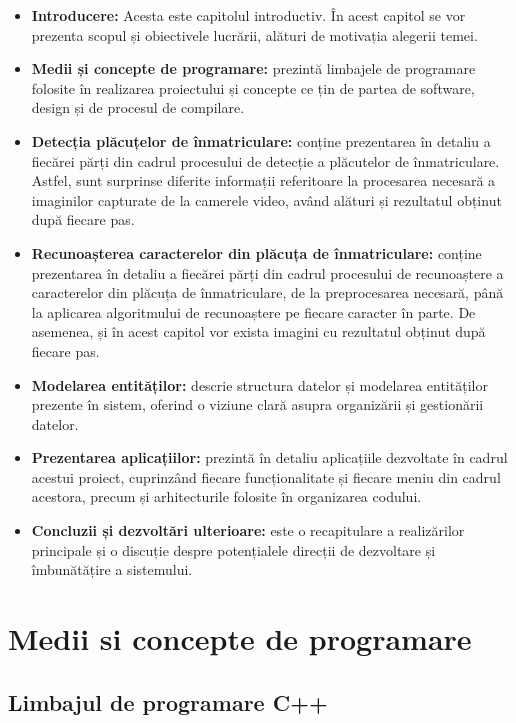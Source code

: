 \documentclass[12pt]{article}
\begin{document}
\begin{itemize}
    \item \textbf{Introducere:} Acesta este capitolul introductiv. \^{I}n acest capitol se vor prezenta scopul și obiectivele lucr\u{a}rii, al\u{a}turi de motivația alegerii temei.
    \item \textbf{Medii și concepte de programare: } prezint\u{a} limbajele de programare folosite \^{i}n realizarea proiectului și concepte ce țin de partea de software, design și de procesul de compilare.
    \item \textbf{Detecția pl\u{a}cuțelor de \^{i}nmatriculare: } conține prezentarea \^{i}n detaliu a fiec\u{a}rei p\u{a}rți din cadrul procesului de detecție a pl\u{a}cutelor de \^{i}nmatriculare. Astfel, sunt surprinse diferite informații referitoare la procesarea necesar\u{a} a imaginilor capturate de la camerele video, av\^{a}nd al\u{a}turi și rezultatul obținut dup\u{a} fiecare pas.
    \item \textbf{Recunoașterea caracterelor din pl\u{a}cuța de \^{i}nmatriculare:} conține prezentarea \^{i}n detaliu a fiec\u{a}rei p\u{a}rți din cadrul procesului de recunoaștere a caracterelor din pl\u{a}cuța de \^{i}nmatriculare, de la preprocesarea necesar\u{a}, p\^{a}n\u{a} la aplicarea algoritmului de recunoaștere pe fiecare caracter \^{i}n parte. De asemenea, și \^{i}n acest capitol vor exista imagini cu rezultatul obținut dup\u{a} fiecare pas.
    \item \textbf{Modelarea entităților:} descrie structura datelor și modelarea entităților prezente în sistem, oferind o viziune clară asupra organizării și gestionării datelor.
    \item \textbf{Prezentarea aplicațiilor:} prezint\u{a} \^{i}n detaliu aplicațiile dezvoltate \^{i}n cadrul acestui proiect, cuprinz\^{a}nd fiecare funcționalitate și fiecare meniu din cadrul acestora, precum și arhitecturile folosite \^{i}n organizarea codului.
    \item \textbf{Concluzii și dezvoltări ulterioare:} este o recapitulare a realizărilor principale și o discuție despre potențialele direcții de dezvoltare și îmbunătățire a sistemului.
\end{itemize}

\newpage

\section{Medii si concepte de programare}

\subsection{Limbajul de programare C++}
\end{document}
